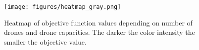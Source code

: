 \begin{figure}[h!]
\texttt{[image: figures/heatmap\_gray.png]}
\caption{Heatmap of objective function values depending on number of drones and drone capacities. The darker the color intensity the smaller the objective value. \label{fig:heatmap}}
\end{figure}
\noindent





